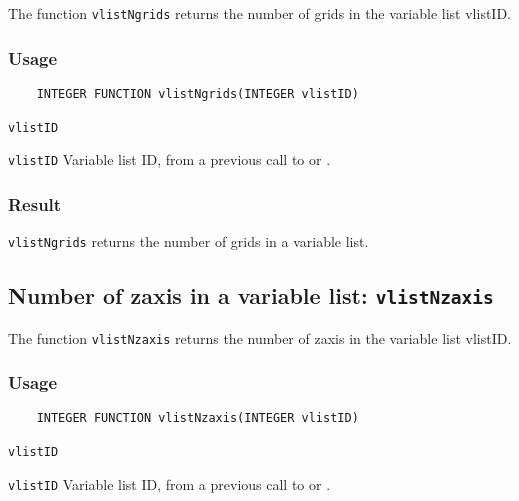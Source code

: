 The function {\texttt{vlistNgrids}} returns the number of grids in the variable list vlistID.

\subsubsection*{Usage}

\begin{verbatim}
    INTEGER FUNCTION vlistNgrids(INTEGER vlistID)
\end{verbatim}

\hspace*{4mm}\begin{minipage}[]{15cm}
\begin{deflist}{\texttt{vlistID}\ }
\item[\texttt{vlistID}]
Variable list ID, from a previous call to {} or {}.

\end{deflist}
\end{minipage}

\subsubsection*{Result}

{\texttt{vlistNgrids}} returns the number of grids in a variable list.



\subsection{Number of zaxis in a variable list: \texttt{vlistNzaxis}}
\label{vlistNzaxis}

The function {\texttt{vlistNzaxis}} returns the number of zaxis in the variable list vlistID.

\subsubsection*{Usage}

\begin{verbatim}
    INTEGER FUNCTION vlistNzaxis(INTEGER vlistID)
\end{verbatim}

\hspace*{4mm}\begin{minipage}[]{15cm}
\begin{deflist}{\texttt{vlistID}\ }
\item[\texttt{vlistID}]
Variable list ID, from a previous call to {} or {}.

\end{deflist}
\end{minipage}

